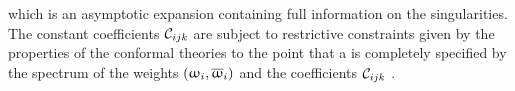 which is an asymptotic expansion containing full information on the singularities.\footnotemark{}
The constant coefficients $\mathcal{C}_{ijk}$ are subject to restrictive constraints given by the properties of the conformal theories to the point that a \cft is completely specified by the spectrum of the weights $(\upomega_i, \overline{\upomega}_i)$ and the coefficients $\mathcal{C}_{ijk}$ \cite{Friedan:1986:ConformalInvarianceSupersymmetry}.

